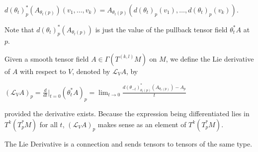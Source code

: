 \(d(\theta_t)_p^* (A_{\theta_t(p)})(v_1, \dots, v_k) = A_{\theta_t(p)} (d(\theta_t)_p(v_1), \dots, d(\theta_t)_p(v_k)).\)

Note that \(d(\theta_t)_p^* (A_{\theta_t(p)})\) is just the value of the pullback tensor field \(\theta_t^* A\) at \(p\).

Given a smooth tensor field \(A \in \Gamma(T^{(k,l)}M)\) on \(M\), we define the Lie derivative of \(A\)
with respect to \(V\), denoted by \(\mathcal{L}_V A\), by

\((\mathcal{L}_V A)_p = \frac{d}{dt}\bigg|_{t=0} (\theta_t^* A)_p 
= \lim_{t \to 0} \frac{d(\theta_{-t})_{\theta_t(p)}^* (A_{\theta_t(p)}) - A_p}{t}\)

provided the derivative exists.
Because the expression being differentiated lies in \(T^k (T_p^* M)\) for all \(t\), 
\((\mathcal{L}_V A)_p\) makes sense as an element of \(T^k (T_p^* M)\).

The Lie Derivative is a connection and sends tensors to tensors of the same type.
